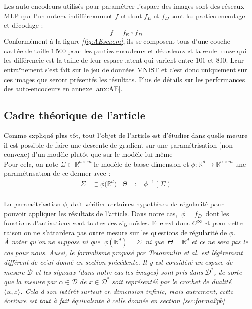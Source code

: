 \documentclass[hidelinks, french]{article} %
\newcommand{\R}{\mathbb{R}}
\newcommand{\lr}{\longrightarrow}
\newcommand{\etal}{\textit{et al. }}
\theoremstyle{enonce}
\theoremstyle{special}
\theoremstyle{rq}
\theoremstyle{exo}
\theoremstyle{demo}
\begin{document}
Les auto-encodeurs utilisés pour paramétrer l'espace des images sont des réseaux MLP que l'on notera indifféremment $f$ et dont $f_E$ et $f_D$ sont les parties encodage et décodage :
\[f = f_E\circ f_D\]
Conformément à la figure \textit{\ref{fig:AEschem}}, ils se composent tous d'une couche cachée de taille $1\,500$ pour les parties encodeurs et décodeurs et la seule chose qui les différencie est la taille de leur espace latent qui varient entre $100$ et $800$. Leur entraînement s'est fait sur le jeu de données MNIST et c'est donc uniquement sur ces images que seront présentés les résultats. Plus de détails sur les performances des auto-encodeurs en annexe \ref{anx:AE}.
\\




\subsection{Cadre théorique de l'article}\label{sec:article1/2}

Comme expliqué plus tôt, tout l'objet de l'article \cite{traonmilin_basins_2022} est d'étudier dans quelle mesure il est possible de faire une descente de gradient sur une paramétrisation (non-convexe) d'un modèle plutôt que sur le modèle lui-même.
\\
Pour cela, on note $\Sigma\subset\R^{n\times m}$ le modèle de basse-dimension et $\phi: \R^d\lr\R^{n\times m}$ une paramétrisation de ce dernier avec :
\begin{align*}\Sigma&\subset\phi\big(\R^d\big)  &  \Theta&:=\phi^{-1}(\Sigma)\end{align*}
\\
La paramétrisation $\phi$, doit vérifier certaines hypothèses de régularité pour pouvoir appliquer les résultats de l'article. Dans notre cas, $\ \phi=f_D\ $ dont les fonctions d'activations sont toutes des sigmoïdes. Elle est donc $C^{\infty}$ et pour cette raison on ne s'attardera pas outre mesure sur les questions de régularité de $\phi$.
\\

\textit{\`A noter qu'on ne suppose ni que $\ \phi(\R^d)=\Sigma\ $ ni que  $\ \Theta=\R^d$ et ce ne sera pas le cas pour nous. Aussi, le formalisme proposé par Traonmilin \etal est légèrement différent de celui donné en section précédente. Il y est considéré un espace de mesure $\mathcal{D}$ et les signaux (dans notre cas les images) sont pris dans $\mathcal{D}^*$, de sorte que la mesure par $\alpha\in\mathcal{D}$ de $x\in\mathcal{D}^*$ soit représentéé par le crochet de dualité $\langle \alpha,x\rangle$. Cela à son intérêt surtout en dimension infinie, mais autrement, cette écriture est tout à fait équivalente à celle donnée en section \ref{sec:forma2pb}}
\\
\end{document}

